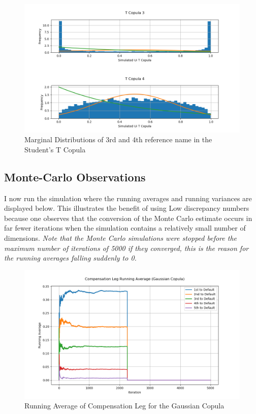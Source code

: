 \documentclass{report}
\theoremstyle{plain}
\theoremstyle{definition}
\begin{document}
\begin{figure}[H]
	\begin{center}
		\includegraphics[width=15cm]{T_Copula_3.png}
		\caption{Marginal Distributions of 3rd and 4th reference name in the Student's T Copula} 
		\label{T_Copula_3}
	\end{center}
\end{figure}


\subsection{Monte-Carlo Observations}

I now run the simulation where the running averages and running variances are displayed below. This illustrates the benefit of using Low discrepancy numbers because one observes that the conversion of the Monte Carlo estimate occurs in far fewer iterations when the simulation contains a relatively small number of dimensions. \textit{Note that the Monte Carlo simulations were stopped before the maximum number of iterations of 5000 if they converged, this is the reason for the running averages falling suddenly to 0.}

\begin{figure}[H]
	\begin{center}
		\includegraphics[width=15cm]{Compensation_Leg_Running_Average_(Gaussian_Copula).png}
		\caption{Running Average of Compensation Leg for the Gaussian Copula} 
		\label{Compensation_Leg_Running_Average_(Gaussian_Copula)}
	\end{center}
\end{figure}
\end{document}
